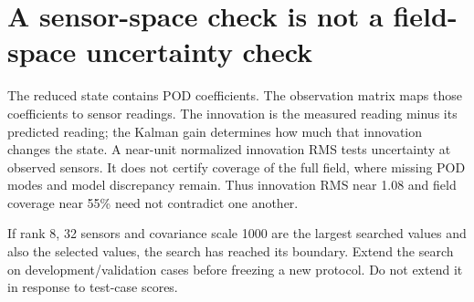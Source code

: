 \section*{A sensor-space check is not a field-space uncertainty check}
The reduced state contains POD coefficients. The observation matrix maps those
coefficients to sensor readings. The innovation is the measured reading minus
its predicted reading; the Kalman gain determines how much that innovation
changes the state. A near-unit normalized innovation RMS tests uncertainty at
observed sensors. It does not certify coverage of the full field, where missing
POD modes and model discrepancy remain. Thus innovation RMS near 1.08 and field
coverage near 55\% need not contradict one another.

If rank 8, 32 sensors and covariance scale 1000 are the largest searched values
and also the selected values, the search has reached its boundary. Extend the
search on development/validation cases before freezing a new protocol. Do not
extend it in response to test-case scores.
